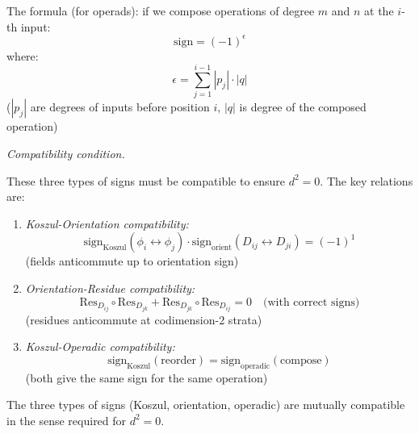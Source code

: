 \begin{convention}
The formula (for operads): if we compose operations of degree $m$ and $n$ at the $i$-th input:
\[\text{sign} = (-1)^{\epsilon}\]
where:
\[\epsilon = \sum_{j=1}^{i-1} |p_j| \cdot |q|\]
($|p_j|$ are degrees of inputs before position $i$, $|q|$ is degree of the composed operation)

\emph{Compatibility condition.}

These three types of signs must be compatible to ensure $d^2 = 0$. The key relations are:

\begin{enumerate}
\item \emph{Koszul-Orientation compatibility:}
\[\text{sign}_{\text{Koszul}}(\phi_i \leftrightarrow \phi_j) \cdot \text{sign}_{\text{orient}}(D_{ij} \leftrightarrow D_{ji}) = (-1)^{1}\]
(fields anticommute up to orientation sign)

\item \emph{Orientation-Residue compatibility:}
\[\text{Res}_{D_{ij}} \circ \text{Res}_{D_{jk}} + \text{Res}_{D_{jk}} \circ \text{Res}_{D_{ij}} = 0 \quad \text{(with correct signs)}\]
(residues anticommute at codimension-2 strata)

\item \emph{Koszul-Operadic compatibility:}
\[\text{sign}_{\text{Koszul}}(\text{reorder}) = \text{sign}_{\text{operadic}}(\text{compose})\]
(both give the same sign for the same operation)
\end{enumerate}

\end{convention}

\begin{lemma}\label{lem:sign-compatibility}
The three types of signs (Koszul, orientation, operadic) are mutually compatible in the sense required for $d^2 = 0$.
\end{lemma}

